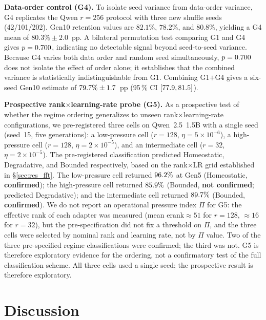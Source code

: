\documentclass[a4paper,fleqn]{cas-dc}
\newif\ifshowchanges
\newcommand{\rev}[1]{\ifshowchanges{\color{blue}#1}\else{#1}\fi}
\begin{document}
\rev{\textbf{Data-order control (G4).}
To isolate seed variance from data-order variance, G4 replicates the Qwen
$r=256$ protocol with three new shuffle seeds (42/101/202). Gen10 retention
values are $82.1\%$, $78.2\%$, and $80.8\%$, yielding a G4 mean of $\rev{80.3}\%\pm2.0$~pp.
A bilateral permutation test comparing G1 and G4 gives $p=0.700$, indicating
no detectable signal beyond seed-to-seed variance. Because G4 varies both data
order and random seed simultaneously, $p=0.700$ does not isolate the
effect of order alone; it establishes that the combined variance is
statistically indistinguishable from G1. Combining G1$+$G4 gives a six-seed
Gen10 estimate of $79.7\%\pm1.7$~pp
(95\,\% CI $[77.9, 81.5]$).}

\rev{\textbf{Prospective rank$\times$learning-rate probe (G5).}
As a prospective test of whether the regime ordering generalizes to unseen
rank$\times$learning-rate configurations, we pre-registered three cells on
Qwen~2.5~1.5B with a single seed (seed~15, five generations): a low-pressure
cell ($r=128$, $\eta=5\times10^{-6}$), a high-pressure cell ($r=128$,
$\eta=2\times10^{-5}$), and an intermediate cell ($r=32$, $\eta=2\times10^{-5}$).
The pre-registered classification predicted Homeostatic, Degradative, and
Bounded respectively, based on the rank$\times$LR grid established in
\S\ref{sec:res_fft}.
The low-pressure cell returned $96.2\%$ at Gen5
(Homeostatic, \textbf{confirmed}); the high-pressure cell returned
$85.9\%$ (Bounded, \textbf{not confirmed}; predicted
Degradative); and the intermediate cell returned $89.7\%$
(Bounded, \textbf{confirmed}).
We do not report an operational pressure index $\Pi$ for G5: the effective rank
of each adapter was measured (mean $\mathrm{erank}\approx51$ for $r=128$,
$\approx16$ for $r=32$), but the pre-specification did not fix a threshold on
$\Pi$, and the three cells were selected by nominal rank and learning rate, not
by $\Pi$ value. \rev{Two of the three pre-specified regime classifications were confirmed; the third was not.} G5 is therefore exploratory evidence for the ordering, not a confirmatory
test of the full classification scheme.
All three cells used a single seed; the prospective result is therefore exploratory.}
\FloatBarrier
\section{Discussion}\label{sec:discussion}
\end{document}

